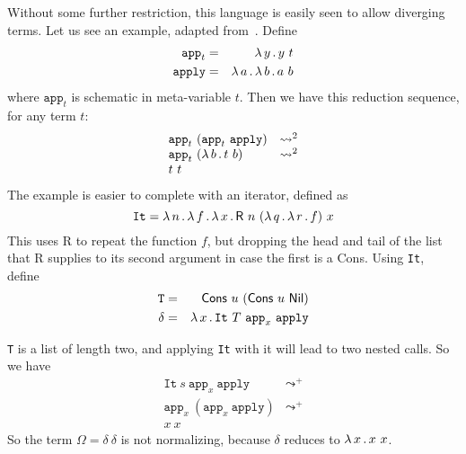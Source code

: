 \documentclass{article}
\begin{document}
\noindent Without some further restriction, this language is
easily seen to allow diverging terms.  Let us see an example, adapted
from~\cite{alves10}.  Define
\begin{eqnarray*}
  \texttt{app}_t & = & \lambda\, y\, .\, y\ t \\
  \texttt{apply} & = & \lambda\, a\, .\, \lambda\, b\, .\, a\ b \\
\end{eqnarray*}
\noindent where $\texttt{app}_t$ is schematic in meta-variable $t$. Then we have this reduction sequence, for any term $t$:
\[
\begin{array}{ll}
  \texttt{app}_t\ (\texttt{app}_t\ \texttt{apply}) & \leadsto^2 \\
  \texttt{app}_t\ (\lambda\, b\, .\, t\ b) & \leadsto^2 \\
  t\ t& \
  \end{array}
\]
\noindent The example is easier to complete with an iterator, defined as
\[
\texttt{It} = \lam{n}{\lam{f}{\lam{x}{\mathsf{R}\ n\ (\lam{q}{\lam{r}{f}})\ x}}}
\]
\noindent This uses \textsf{R} to repeat the function $f$, but dropping the head
and tail of the list that \textsf{R} supplies to its second argument in case the first is a \textsf{Cons}.  Using \texttt{It}, define
\begin{eqnarray*}
\texttt{T} & = & \mathsf{Cons}\ u\ (\mathsf{Cons}\ u\ \mathsf{Nil}) \\
\delta & = & \lam{x}{\texttt{It}\ T\ \texttt{app}_x\ \texttt{apply}}
\end{eqnarray*}

\noindent \texttt{T} is a list of length two, and applying \texttt{It} with it
will lead to two nested calls.  So we have
\[
\begin{array}{ll}
  \texttt{It}\ s\ \texttt{app}_x\ \texttt{apply} & \leadsto^+ \\
  \texttt{app}_x\ (\texttt{app}_x\ \texttt{apply}) & \leadsto^+ \\
  x\ x& \
\end{array}
\]
\noindent So the term $\Omega = \delta\ \delta$ is not normalizing, 
because $\delta$ reduces to $\lambda\, x\, .\, x\ x$.
\end{document}

